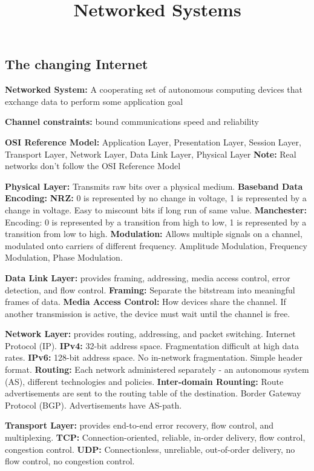 \documentclass{article}
\title{Networked Systems}
\author{}
\date{}
\begin{document}
\footnotesize

\subsection*{The changing Internet}

\noindent \textbf{Networked System:} A cooperating set of autonomous computing devices that exchange data to perform some application goal

\noindent \textbf{Channel constraints:} bound communications speed and reliability

\noindent \textbf{OSI Reference Model:} Application Layer, Presentation Layer, Session Layer, Transport Layer, Network Layer, Data Link Layer, Physical Layer
\textbf{Note:} Real networks don't follow the OSI Reference Model

\noindent \textbf{Physical Layer:} Transmits raw bits over a physical medium.
\textbf{Baseband Data Encoding:}
\textbf{NRZ:} 0 is represented by no change in voltage, 1 is represented by a change in voltage. Easy to miscount bits if long run of same value.
\textbf{Manchester:} Encoding: 0 is represented by a transition from high to low, 1 is represented by a transition from low to high.
\textbf{Modulation:} Allows multiple signals on a channel, modulated onto carriers of different frequency. Amplitude Modulation, Frequency Modulation, Phase Modulation.

\noindent \textbf{Data Link Layer:} provides framing, addressing, media access control, error detection, and flow control.
\textbf{Framing:} Separate the bitstream into meaningful frames of data.
\textbf{Media Access Control:} How devices share the channel. If another transmission is active, the device must wait until the channel is free.


\noindent \textbf{Network Layer:} provides routing, addressing, and packet switching. Internet Protocol (IP).
\textbf{IPv4:} 32-bit address space. Fragmentation difficult at high data rates.
\textbf{IPv6:} 128-bit address space. No in-network fragmentation. Simple header format.
\textbf{Routing:} Each network administered separately - an autonomous system (AS), different technologies and policies.
\textbf{Inter-domain Rounting:} Route advertisements are sent to the routing table of the destination. Border Gateway Protocol (BGP). Advertisements have AS-path.


\noindent \textbf{Transport Layer:} provides end-to-end error recovery, flow control, and multiplexing.
\textbf{TCP:} Connection-oriented, reliable, in-order delivery, flow control, congestion control.
\textbf{UDP:} Connectionless, unreliable, out-of-order delivery, no flow control, no congestion control.
\end{document}
